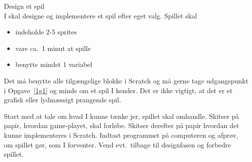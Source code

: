 Design et spil\\
I skal designe og implementere et spil efter eget valg. Spillet skal
\begin{itemize}
\item indeholde 2-5 sprites 
\item vare ca.\ 1 minut at spille 
\item benytte mindst 1 variabel
\end{itemize}
Det må benytte alle tilgængelige blokke i Scratch og må gerne tage udgangspunkt i Opgave~\ref{1g1} og minde om et spil I kender. Det er ikke vigtigt, at det er et grafisk eller lydmæssigt prangende spil.

Start med at tale om hvad I kunne tænke jer, spillet skal omhandle. Skitser på papir, hvordan game-playet, skal forløbe. Skitser derefter på papir hvordan det kunne implementeres i Scratch. Indtast programmet på computeren og afprøv, om spillet gør, som I forventer. Vend evt.\ tilbage til designfasen og forbedre spillet.
